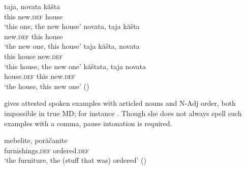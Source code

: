 \documentclass[output=paper]{langscibook}
\begin{document}

\ex \label{houses}
\ea \label{houses1}
\gll taja, novata kăšta\\
this new.\textsc{def} house\\
\glt `this one, the new house’
\ex \label{houses2}
\gll novata, taja kăšta \\
    new.\textsc{def} this house \\
    \glt `the new one, this house'
\ex \label{houses3}
\gll taja kăšta, novata \\
     this house new.\textsc{def}\\
    \glt `this house, the new one'
\ex \label{houses4}
\gll kăštata, taja  novata \\
     house.\textsc{def} this new.\textsc{def}\\
    \glt `the house, this new one' \hfill ()
\z
\z

\noindent \citet{Angelova1994} gives attested spoken examples with articled nouns and N-Adj order, both impossible in true MD; for instance . Though she does not always spell such examples with a comma, pause intonation is required.

\ea \label{furniture}
\gll  mebelite, porăčanite \\
furnishings.\textsc{def} ordered.\textsc{def} \\
\glt `the furniture, the (stuff that was) ordered’  \hfill ()
\z
\end{document}
